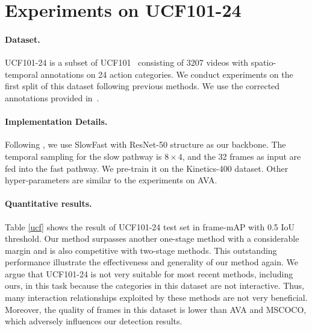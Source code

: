 \documentclass[final]{cvpr}
\begin{document}
\section{Experiments on UCF101-24}
\paragraph{Dataset.}
UCF101-24 is a subset of UCF101~\cite{soomro2012ucf101} consisting of 3207 videos with spatio-temporal annotations on 24 action categories. We conduct experiments on the first split of this dataset following previous methods. We use the corrected annotations provided in~\cite{singh2017online}.
\paragraph{Implementation Details.}
Following \cite{DBLP:conf/cvpr/PanCSLS021}, we use SlowFast with ResNet-50 structure as our backbone. The temporal sampling for the slow pathway is $8\times 4$, and the 32 frames as input are fed into the fast pathway. We pre-train it on the Kinetics-400 dataset. Other hyper-parameters are similar to the experiments on AVA.
\paragraph{Quantitative results.}
Table \ref{ucf} shows the result of UCF101-24 test set in frame-mAP with 0.5 IoU threshold. Our method surpasses another one-stage method with a considerable margin and is also competitive with two-stage methods. This outstanding performance illustrate the effectiveness and generality of our method again. We argue that UCF101-24 is not very suitable for most recent methods, including ours, in this task because the categories in this dataset are not interactive. Thus, many interaction relationships exploited by these methods are not very beneficial. Moreover, the quality of frames in this dataset is lower than AVA and MSCOCO, which adversely influences our detection results. 
\end{document}
